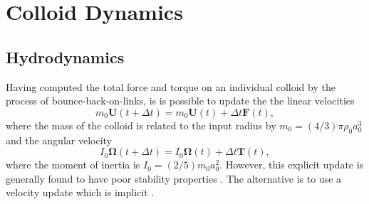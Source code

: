 %
%
%
%
%

\section{Colloid Dynamics}

\label{section:colloids}


\subsection{Hydrodynamics}

\label{section-colloid-hydrodynamics}

Having computed the total force and torque on an individual colloid
by the process of bounce-back-on-links,
is is possible to update the the linear velocities
\begin{equation}
m_0 \mathbf{U}(t + \Delta t) = m_0 \mathbf{U}(t) + \Delta t \mathbf{F} (t),
\end{equation}
where the mass of the colloid is related to the input radius by
$m_0 = (4/3)\pi\rho_0 a_0^3$ and the angular
velocity
\begin{equation}
I_0 \mathbf{\Omega} (t + \Delta t) = I_0 \mathbf{\Omega}(t) + \Delta t
\mathbf{T}(t),
\end{equation}
where the moment of inertia is $I_0 = (2/5) m_0 a_0^2$.
However, this explicit update is generally found to have poor stability
properties \cite{l94b, nguyen-ladd2002}. The alternative is to use a
velocity update
which is implicit \cite{heemels,nguyen-ladd2002}.


